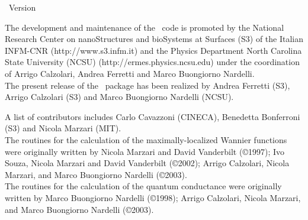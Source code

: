 
\thispagestyle{empty}
\begin{centering}
{\LARGE \WANT\ Version \WANTVERSION}\\
\end{centering}
\vspace{0.35in}

 The development and  maintenance of the
\WANT\ code is promoted by the National Research Center on
nanoStructures and bioSystems at Surfaces (S3) of the Italian
INFM-CNR (http://www.s3.infm.it) and the Physics Department North
Carolina State University (NCSU) (http://ermes.physics.ncsu.edu)
under the coordination of Arrigo Calzolari, Andrea Ferretti  and
Marco
Buongiorno Nardelli.\\

\noindent The present release of the \WANT\ package has been
realized by Andrea Ferretti (S3), Arrigo Calzolari (S3) and Marco
Buongiorno Nardelli (NCSU).

\noindent A list of contributors includes Carlo Cavazzoni
(CINECA), Benedetta Bonferroni (S3) and Nicola Marzari (MIT). \\

\noindent The routines for the calculation of the
maximally-localized Wannier functions were originally written by
Nicola Marzari and David Vanderbilt (\copyright 1997);  Ivo Souza,
Nicola Marzari and David Vanderbilt (\copyright 2002); Arrigo
Calzolari, Nicola Marzari, and Marco Buongiorno Nardelli (\copyright 2003).\\

\noindent The routines for the calculation of the quantum
conductance were originally written by Marco Buongiorno Nardelli
(\copyright 1998); Arrigo Calzolari, Nicola Marzari, and
Marco Buongiorno Nardelli (\copyright 2003).\\
 \vspace{0.25in}

